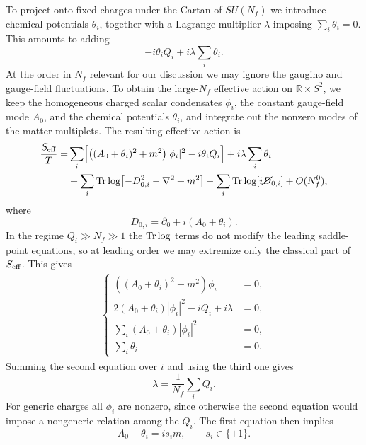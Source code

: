 \documentclass[a4paper,11pt]{article}
\begin{document}
To project onto fixed charges under the Cartan of $SU(N_f)$ we introduce chemical potentials $\theta_i$, together with a Lagrange multiplier $\lambda$ imposing $\sum\limits_i\theta_i=0$. This amounts to adding
\begin{equation}
  -i\theta_i Q_i + i\lambda \sum_i\theta_i.
\end{equation}
At the order in $N_f$ relevant for our discussion we may ignore the gaugino and gauge-field fluctuations. To obtain the large-$N_f$ effective action on $\mathbb R\times S^2$, we keep the homogeneous charged scalar condensates $\phi_i$, the constant gauge-field mode $A_0$, and the chemical potentials $\theta_i$, and integrate out the nonzero modes of the matter multiplets. The resulting effective action is
\begin{equation}
\begin{split}
    \frac{S_{\rm eff}}{T}
    =& \sum_i\Bigl[
    \bigl((A_0+\theta_i)^2+m^2\bigr)|\phi_i|^2
    -i\theta_iQ_i
    \Bigr] +i\lambda\sum_i\theta_i
    \\
    &+\sum_i\Tr\log\!\left[-D_{0,i}^2-\nabla^2+m^2\right]
    - \sum_i\Tr\log\!\left[i\cancel{D}_{0,i}\right]+O(N_f^0),
\end{split}
\end{equation}
where
\begin{equation}
  D_{0,i}=\partial_0+i(A_0+\theta_i).
\end{equation}
In the regime $Q_i\gg N_f\gg 1$ the $\Tr\log$ terms do not modify the leading saddle-point equations, so at leading order we may extremize only the classical part of $S_{\rm eff}$. This gives
\begin{gather}
\left\{
    \begin{matrix}
        \left((A_0+\theta_i)^2+m^2\right)\phi_i &= 0,\\
        2(A_0+\theta_i)|\phi_i|^2-iQ_i+i\lambda &= 0,\\
        \sum_i (A_0+\theta_i)|\phi_i|^2 &= 0,\\
        \sum_i\theta_i &= 0.
    \end{matrix}
\right.
\end{gather}
Summing the second equation over $i$ and using the third one gives
\begin{equation}
  \lambda = \frac{1}{N_f}\sum_i Q_i.
\end{equation}
For generic charges all $\phi_i$ are nonzero, since otherwise the second equation would impose a nongeneric relation among the $Q_i$. The first equation then implies
\begin{equation}
  A_0+\theta_i=i s_i m,\qquad s_i\in\{\pm1\}.
\end{equation}
\end{document}
